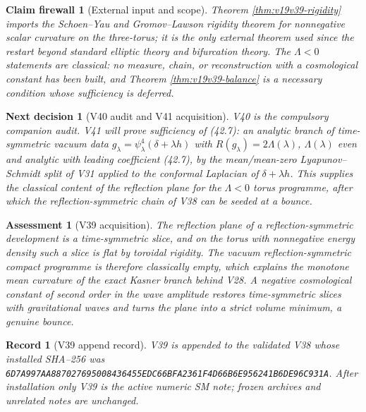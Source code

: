 \documentclass[11pt]{article}
\newtheorem{firewall}[theorem]{Claim firewall}
\newtheorem{decision}[theorem]{Next decision}
\newtheorem{assessment}[theorem]{Assessment}
\newtheorem{record}[theorem]{Record}
\theoremstyle{remark}
\begin{document}
\begin{firewall}[External input and scope]
\label{fire:v19v39}
Theorem \ref{thm:v19v39-rigidity} imports the Schoen--Yau and
Gromov--Lawson rigidity theorem for nonnegative scalar curvature on the
three-torus; it is the only external theorem used since the restart
beyond standard elliptic theory and bifurcation theory.  The
\(\Lambda<0\) statements are classical: no measure, chain, or
reconstruction with a cosmological constant has been built, and Theorem
\ref{thm:v19v39-balance} is a necessary condition whose sufficiency is
deferred.
\end{firewall}

\begin{decision}[V40 audit and V41 acquisition]
\label{dec:v19v39-next}
V40 is the compulsory companion audit.  V41 will prove sufficiency of
(42.7): an analytic branch of time-symmetric vacuum data
\(g_\lambda=\psi_\lambda^4(\delta+\lambda h)\) with
\(R(g_\lambda)=2\Lambda(\lambda)\), \(\Lambda(\lambda)\) even and
analytic with leading coefficient (42.7), by the mean/mean-zero
Lyapunov--Schmidt split of V31 applied to the conformal Laplacian of
\(\delta+\lambda h\).  This supplies the classical content of the
reflection plane for the \(\Lambda<0\) torus programme, after which the
reflection-symmetric chain of V38 can be seeded at a bounce.
\end{decision}

\begin{assessment}[V39 acquisition]
\label{ass:v19v39}
The reflection plane of a reflection-symmetric development is a
time-symmetric slice, and on the torus with nonnegative energy density
such a slice is flat by toroidal rigidity.  The vacuum
reflection-symmetric compact programme is therefore classically empty,
which explains the monotone mean curvature of the exact Kasner branch
behind V28.  A negative cosmological constant of second order in the
wave amplitude restores time-symmetric slices with gravitational waves
and turns the plane into a strict volume minimum, a genuine bounce.
\end{assessment}

\begin{record}[V39 append record]
\label{rec:v19v39}
V39 is appended to the validated V38 whose installed SHA--256 was
\texttt{6D7A997AA887027695008436455EDC66BFA2361F4D66B6E956241B6DE96C931A}.
After installation only V39 is the active numeric SM note; frozen
archives and unrelated notes are unchanged.
\end{record}
\end{document}
